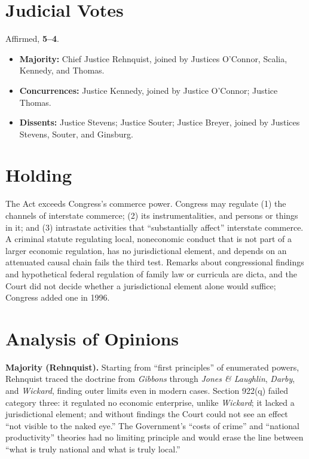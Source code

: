 \documentclass[12pt]{article}
\begin{document}
\section{Judicial Votes}

Affirmed, \textbf{5--4}.
\begin{itemize}
\item \textbf{Majority:} Chief Justice Rehnquist, joined by Justices O'Connor, Scalia, Kennedy, and Thomas.
\item \textbf{Concurrences:} Justice Kennedy, joined by Justice O'Connor; Justice Thomas.
\item \textbf{Dissents:} Justice Stevens; Justice Souter; Justice Breyer, joined by Justices Stevens, Souter, and Ginsburg.
\end{itemize}

\section{Holding}

The Act exceeds Congress's commerce power. Congress may regulate (1) the channels of interstate commerce; (2) its instrumentalities, and persons or things in it; and (3) intrastate activities that ``substantially affect'' interstate commerce. A criminal statute regulating local, noneconomic conduct that is not part of a larger economic regulation, has no jurisdictional element, and depends on an attenuated causal chain fails the third test. Remarks about congressional findings and hypothetical federal regulation of family law or curricula are dicta, and the Court did not decide whether a jurisdictional element alone would suffice; Congress added one in 1996.

\section{Analysis of Opinions}

\textbf{Majority (Rehnquist).} Starting from ``first principles'' of enumerated powers, Rehnquist traced the doctrine from \textit{Gibbons} through \textit{Jones \& Laughlin}, \textit{Darby}, and \textit{Wickard}, finding outer limits even in modern cases. Section 922(q) failed category three: it regulated no economic enterprise, unlike \textit{Wickard}; it lacked a jurisdictional element; and without findings the Court could not see an effect ``not visible to the naked eye.'' The Government's ``costs of crime'' and ``national productivity'' theories had no limiting principle and would erase the line between ``what is truly national and what is truly local.''
\end{document}
